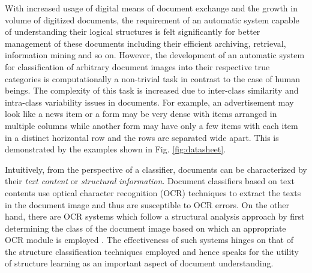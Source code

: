 \documentclass[10pt,conference,a4paper]{IEEEtran}
\begin{document}
With increased usage of digital means of document exchange and the growth in volume of digitized documents, the requirement of an automatic system capable of understanding their logical structures is felt significantly for better management of these documents including their efficient archiving, retrieval, information mining and so on. However, the development of an automatic system for classification of arbitrary document images into their respective true categories is computationally a non-trivial task in contrast to the case of human beings. The complexity of this task is increased due to inter-class similarity and intra-class variability issues in documents. For example, an advertisement may look like a news item or a form may be very dense with items arranged in multiple columns while another form may have only a few items with each item in a distinct horizontal row and the rows are separated wide apart. This is demonstrated by the examples shown in Fig. \ref{fig:datasheet}.

Intuitively, from the perspective of a classifier, documents can be characterized by their \textit{text content} or \textit{structural information}\cite{chen2007}. Document classifiers based on text contents use optical character recognition (OCR) techniques to extract the texts in the document image and thus are susceptible to OCR errors. On the other hand, there are OCR systems which follow a structural analysis approach by first determining the class of the document image based on which an appropriate OCR module is employed \cite{appiani2001}. The effectiveness of such systems hinges on that of the structure classification techniques employed and hence speaks for the utility of structure learning as an important aspect of document understanding.
\end{document}
